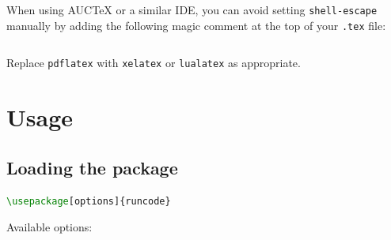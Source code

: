 \documentclass{ltxdoc}
\begin{document}
When using AUCTeX or a similar IDE, you can avoid setting
\texttt{shell-escape} manually by adding the following magic comment at
the top of your \texttt{.tex} file:
\begin{lstlisting}[language=tex]
% !TEX program = pdflatex --shell-escape
\end{lstlisting}
Replace \texttt{pdflatex} with \texttt{xelatex} or \texttt{lualatex} as
appropriate.

\section{Usage}
\label{sec:usage}

\subsection{Loading the package}

\begin{lstlisting}[language=tex]
\usepackage[options]{runcode}
\end{lstlisting}

Available options:
\end{document}
